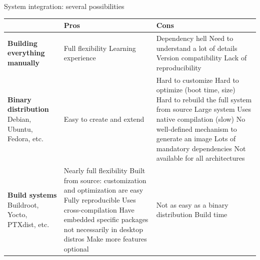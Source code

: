 \begin{frame}{System integration: several possibilities}
  \begin{center}
  \tiny
  \begin{tabularx}{13cm}{|X|X|X|}
    \hline
    & {\bf Pros} & {\bf Cons} \\
    \hline
    {\bf Building everything manually} &
    Full flexibility \newline
    Learning experience &
    Dependency hell \newline
    Need to understand a lot of details \newline
    Version compatibility \newline
    Lack of reproducibility \\
    \hline
    {\bf Binary distribution} \newline Debian, Ubuntu, Fedora, etc.
    &
    Easy to create and extend
    &
    Hard to customize \newline
    Hard to optimize (boot time, size) \newline
    Hard to rebuild the full system from source \newline
    Large system \newline
    Uses native compilation (slow) \newline
    No well-defined mechanism to generate an image \newline
    Lots of mandatory dependencies \newline
    Not available for all architectures \\
    \hline
    {\bf Build systems} \newline Buildroot, Yocto, PTXdist, etc.
    &
    Nearly full flexibility \newline
    Built from source: customization and optimization are easy \newline
    Fully reproducible \newline
    Uses cross-compilation \newline
    Have embedded specific packages not necessarily in desktop distros \newline
    Make more features optional
    &
    Not as easy as a binary distribution \newline
    Build time \\
    \hline
  \end{tabularx}
  \end{center}
\end{frame}

